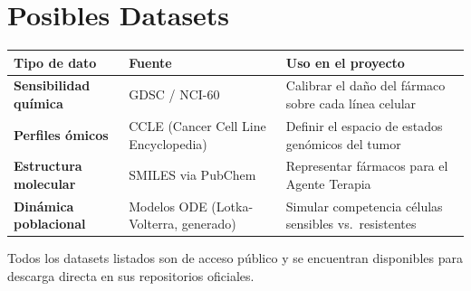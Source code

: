 \documentclass[a4paper,11pt]{article}
\begin{document}
\section{Posibles Datasets}

\begin{center}
\small
\begin{tabular}{>{\bfseries}p{3.2cm} p{4.8cm} p{3.2cm}}
\toprule
Tipo de dato & Fuente & Uso en el proyecto \\
\midrule
Sensibilidad química &
  GDSC / NCI-60 &
  Calibrar el daño del fármaco sobre cada línea celular \\
Perfiles ómicos &
  CCLE (Cancer Cell Line Encyclopedia) &
  Definir el espacio de estados genómicos del tumor \\
Estructura molecular &
  SMILES via PubChem &
  Representar fármacos para el Agente Terapia \\
Dinámica poblacional &
  Modelos ODE (Lotka-Volterra, generado) &
  Simular competencia células sensibles vs.\ resistentes \\
\bottomrule
\end{tabular}
\end{center}

{\footnotesize Todos los datasets listados son de acceso público y se
encuentran disponibles para descarga directa en sus repositorios oficiales.}
\end{document}
